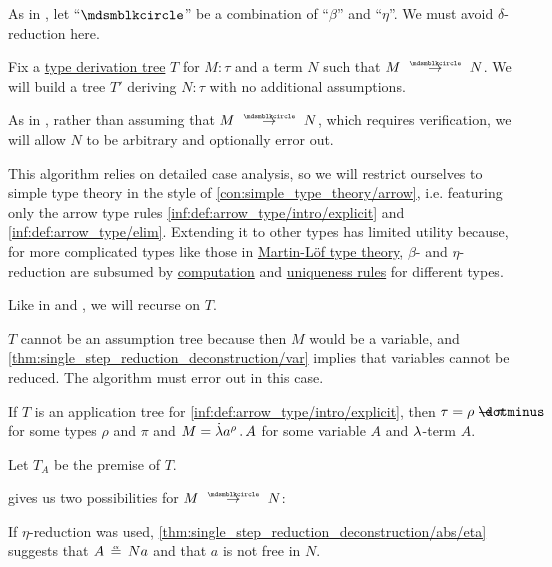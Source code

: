 \begin{algorithm}\label{alg:simply_typed_reduction}
  As in , let \enquote{\( {\Anon} \)} be a combination of \enquote{\( \beta \)} and \enquote{\( \eta \)}. We must avoid \( \delta \)-reduction here.

  Fix a \hyperref[def:type_derivation_tree]{type derivation tree} \( T \) for \( M: \tau \) and a term \( N \) such that \( M \pred N \). We will build a tree \( T' \) deriving \( N: \tau \) with no additional assumptions.

  As in , rather than assuming that \( M \pred N \), which requires verification, we will allow \( N \) to be arbitrary and optionally error out.

  This algorithm relies on detailed case analysis, so we will restrict ourselves to simple type theory in the style of \cref{con:simple_type_theory/arrow}, i.e. featuring only the arrow type rules \ref{inf:def:arrow_type/intro/explicit} and \ref{inf:def:arrow_type/elim}. Extending it to other types has limited utility because, for more complicated types like those in \hyperref[def:mltt]{Martin-L\"of type theory}, \( \beta \)- and \( \eta \)-reduction are subsumed by \hyperref[rem:type_theory_rule_classification/equality/comp]{computation} and \hyperref[rem:type_theory_rule_classification/equality/uniq]{uniqueness rules} for different types.

  Like in  and , we will recurse on \( T \).

  \begin{thmenum}
     \( T \) cannot be an assumption tree because then \( M \) would be a variable, and \cref{thm:single_step_reduction_deconstruction/var} implies that variables cannot be reduced. The algorithm must error out in this case.

     If \( T \) is an application tree for \ref{inf:def:arrow_type/intro/explicit}, then \( \tau = \rho \synimplies \pi \) for some types \( \rho \) and \( \pi \) and \( M = \qabs {a^\rho} A \) for some variable \( A \) and \( {\mathrm \lambda} \)-term \( A \).

    Let \( T_A \) be the premise of \( T \).

     gives us two possibilities for \( M \pred N \):
    \begin{thmenum}
       If \( \eta \)-reduction was used, \cref{thm:single_step_reduction_deconstruction/abs/eta} suggests that \( A \aequiv Na \) and that \( a \) is not free in \( N \).


\end{thmenum}
\end{thmenum}
\end{algorithm}
